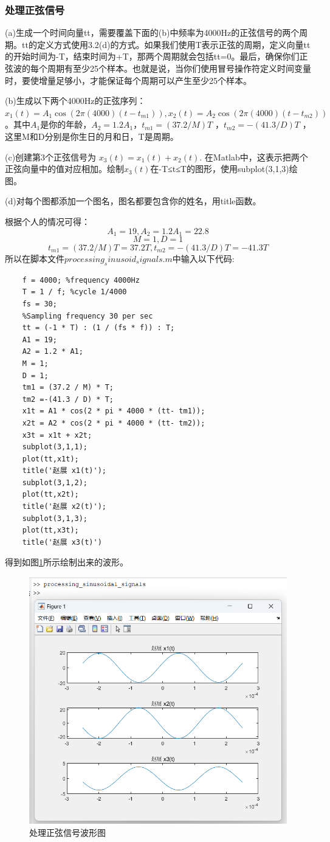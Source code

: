 \documentclass[UTF8]{ctexart}
\begin{document}
\subsubsection{处理正弦信号}
\begin{framed}
    (a)生成一个时间向量tt，需要覆盖下面的(b)中频率为4000Hz的正弦信号的两个周期。tt的定义方式使用3.2(d)的方式。如果我们使用T表示正弦的周期，定义向量tt的开始时间为-T，结束时间为+T，那两个周期就会包括tt=0。最后，确保你们正弦波的每个周期有至少25个样本。也就是说，当你们使用冒号操作符定义时间变量时，要使增量足够小，才能保证每个周期可以产生至少25个样本。

    (b)生成以下两个4000Hz的正弦序列：$x_1(t)=A_1\cos(2\pi(4000)(t-t_{m1})),x_2(t)=A_2\cos(2\pi(4000)(t-t_{m2}))$。其中$A_1$是你的年龄，$A_2=1.2A_1$，$t_{m1} = (37.2/M)T$ ，$t_{m2} = -(41.3/D)T$ ，这里M和D分别是你生日的月和日，T是周期。

    (c)创建第3个正弦信号为 $x_3(t) = x_1(t) + x_2(t)$. 在Matlab中，这表示把两个正弦向量中的值对应相加。绘制$x_3(t)$在-T≤t≤T的图形，使用subplot(3,1,3)绘图。

    (d)对每个图都添加一个图名，图名都要包含你的姓名，用title函数。
\end{framed}
根据个人的情况可得：
$$A_1=19,A_2=1.2A_1=22.8$$
$$M=1,D=1$$
$$t_{m1}=(37.2/M)T=37.2T,t_{m2}=-(41.3/D)T=-41.3T$$
所以在脚本文件$processing_sinusoid_signals.m$中输入以下代码:
\begin{verbatim}
    f = 4000; %frequency 4000Hz
    T = 1 / f; %cycle 1/4000
    fs = 30;
    %Sampling frequency 30 per sec
    tt = (-1 * T) : (1 / (fs * f)) : T;
    A1 = 19;
    A2 = 1.2 * A1;
    M = 1;
    D = 1;
    tm1 = (37.2 / M) * T;
    tm2 =-(41.3 / D) * T;
    x1t = A1 * cos(2 * pi * 4000 * (tt- tm1));
    x2t = A2 * cos(2 * pi * 4000 * (tt- tm2));
    x3t = x1t + x2t;
    subplot(3,1,1);
    plot(tt,x1t);
    title('赵展 x1(t)');
    subplot(3,1,2);
    plot(tt,x2t);
    title('赵展 x2(t)');
    subplot(3,1,3);
    plot(tt,x3t);
    title('赵展 x3(t)')
\end{verbatim}
得到如图\ref{img:processing_sinusoidal_signals}所示绘制出来的波形。
\begin{figure}[htbp]
    \centering
    \includegraphics[width=0.7\linewidth]{processing_sinusoidal_signals.png}
    \caption{处理正弦信号波形图}
    \label{img:processing_sinusoidal_signals}
\end{figure}
\end{document}
